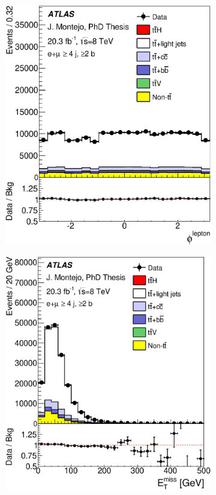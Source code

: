 \begin{figure}[tp!]
\begin{subfigure}{0.32\textwidth}
  \includegraphics[width=\textwidth]{Modeling/Figures/plots_4j2b/lep_phi_ELEMUON_4jetin2btagin_NOMINAL.eps}
  \caption{} \end{subfigure}
  \begin{subfigure}{0.32\textwidth}
  \includegraphics[width=\textwidth]{Modeling/Figures/plots_4j2b/met_ELEMUON_4jetin2btagin_NOMINAL.eps}

\end{subfigure}
\end{figure}
